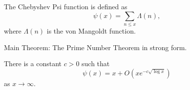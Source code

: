 
\begin{definition}
The Chebyshev Psi function is defined as
$$
\psi(x) = \sum_{n \leq x} \Lambda(n),
$$
where $\Lambda(n)$ is the von Mangoldt function.
\end{definition}




Main Theorem: The Prime Number Theorem in strong form.
\begin{theorem}[PrimeNumberTheorem]
There is a constant $c > 0$ such that
$$
ψ (x) = x + O(x e^{-c \sqrt{\log x}})
$$
as $x\to \infty$.
\end{theorem}


